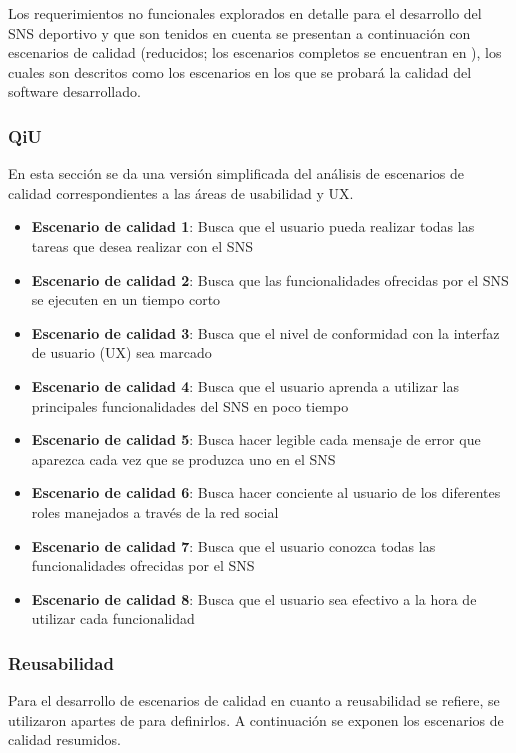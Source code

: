 Los requerimientos no funcionales explorados en detalle para el desarrollo del SNS deportivo y que son tenidos en cuenta se presentan a continuación con escenarios de calidad (reducidos; los escenarios completos se encuentran en \cite{anexos_tesis}), los cuales son descritos como los escenarios en los que se probará la calidad del software desarrollado.

\subsubsection{QiU}

En esta sección se da una versión simplificada del análisis de escenarios de calidad correspondientes a las áreas de usabilidad y UX.

\begin{itemize}
	\item \textbf{Escenario de calidad 1}: Busca que el usuario pueda realizar todas las tareas que desea realizar con el SNS
	\item \textbf{Escenario de calidad 2}: Busca que las funcionalidades ofrecidas por el SNS se ejecuten en un tiempo corto
	\item \textbf{Escenario de calidad 3}: Busca que el nivel de conformidad con la interfaz de usuario (UX) sea marcado
	\item \textbf{Escenario de calidad 4}: Busca que el usuario aprenda a utilizar las principales funcionalidades del SNS en poco tiempo
	\item \textbf{Escenario de calidad 5}: Busca hacer legible cada mensaje de error que aparezca cada vez que se produzca uno en el SNS
	\item \textbf{Escenario de calidad 6}: Busca hacer conciente al usuario de los diferentes roles manejados a través de la red social
	\item \textbf{Escenario de calidad 7}: Busca que el usuario conozca todas las funcionalidades ofrecidas por el SNS
	\item \textbf{Escenario de calidad 8}: Busca que el usuario sea efectivo a la hora de utilizar cada funcionalidad
\end{itemize}

\subsubsection{Reusabilidad}

Para el desarrollo de escenarios de calidad en cuanto a reusabilidad se refiere, se utilizaron apartes de \cite{soa_principles} para definirlos. A continuación se exponen los escenarios de calidad resumidos.

